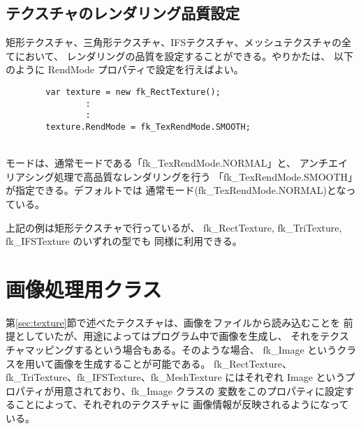 \subsection{テクスチャのレンダリング品質設定}
矩形テクスチャ、三角形テクスチャ、IFSテクスチャ、メッシュテクスチャの全てにおいて、
レンダリングの品質を設定することができる。やりかたは、
以下のように RendMode プロパティで設定を行えばよい。
\\
\begin{screen}
\begin{verbatim}
        var texture = new fk_RectTexture();
                :
                :
        texture.RendMode = fk_TexRendMode.SMOOTH;
\end{verbatim}
\end{screen}
~ \\
モードは、通常モードである「fk\_TexRendMode.NORMAL」と、
アンチエイリアシング処理で高品質なレンダリングを行う
「fk\_TexRendMode.SMOOTH」が指定できる。デフォルトでは
通常モード(fk\_TexRendMode.NORMAL)となっている。

上記の例は矩形テクスチャで行っているが、
fk\_RectTexture, fk\_TriTexture, fk\_IFSTexture のいずれの型でも
同様に利用できる。

\section{画像処理用クラス} \label{sec:image}
第\ref{sec:texture}節で述べたテクスチャは、画像をファイルから読み込むことを
前提としていたが、用途によってはプログラム中で画像を生成し、
それをテクスチャマッピングするという場合もある。そのような場合、
fk\_Image というクラスを用いて画像を生成することが可能である。
fk\_RectTexture、fk\_TriTexture、fk\_IFSTexture、fk\_MeshTexture にはそれぞれ
Image というプロパティが用意されており、fk\_Image クラスの
変数をこのプロパティに設定することによって、それぞれのテクスチャに
画像情報が反映されるようになっている。

